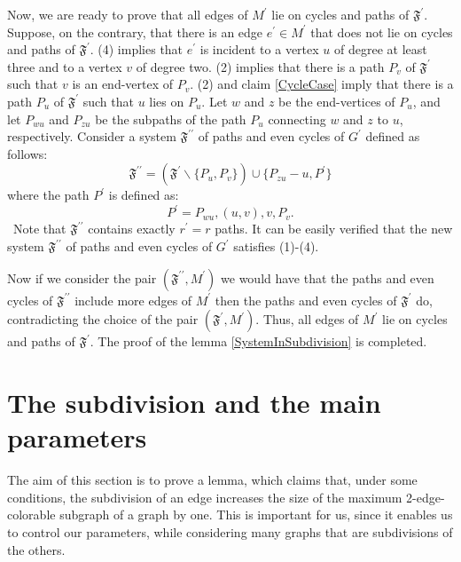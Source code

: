 \documentclass[fleqn,12pt,twoside]{article}
\newenvironment{proof}[1][Proof.]{\begin{trivlist}
\item[\hskip \labelsep {\bfseries #1}]}{\end{trivlist}}
\begin{document}
\begin{proof}
Now, we are ready to prove that all edges of $M^{\prime }$ lie on
cycles and paths of $\mathfrak{F}^{\prime }$. Suppose, on the
contrary, that there is an edge $e^{\prime }\in M^{\prime }$ that
does not lie on cycles and paths of $\mathfrak{F}^{\prime }$. (4)
implies that $e^{\prime }$ is incident to a vertex $u$ of degree at
least three and to a vertex $v$ of degree two. (2)
implies that there is a path $P_{v}$ of $\mathfrak{F}^{\prime }$ such that $v $ is an end-vertex of $P_{v}$. (2) and claim \ref{CycleCase} imply
that
there is a path $P_{u}$ of $\mathfrak{F}^{\prime }$ such that $u$ lies on $P_{u}$. Let $w$ and $z$ be the end-vertices of $P_{u}$, and let $P_{wu}$ and $P_{zu}$ be the subpaths of the path $P_{u}$ connecting $w$ and $z$
to $u$, respectively. Consider a system $\mathfrak{F}^{\prime \prime
}$ of paths and even cycles of $G^{\prime }$ defined as follows:
\begin{equation*}
\mathfrak{F}^{\prime \prime }=(\mathfrak{F}^{\prime }\backslash
\{P_{u},P_{v}\})\cup \{P_{zu}-u,P^{\prime }\}
\end{equation*}where the path $P^{\prime }$ is defined as:\begin{equation*}
P^{\prime }=P_{wu},(u,v),v,P_{v}\text{.}
\end{equation*}\ Note that $\mathfrak{F}^{\prime \prime }$ contains exactly
$r^{\prime }=r$ paths. It can be easily verified that the new system
$\mathfrak{F}^{\prime \prime }$ of paths and even cycles of
$G^{\prime }$ satisfies (1)-(4).

Now if we consider the pair $(\mathfrak{F}^{\prime \prime
},M^{\prime })$ we would have that the paths and even cycles of
$\mathfrak{F}^{\prime \prime }$
include more edges of $M^{\prime }$ then the paths and even cycles of $\mathfrak{F}^{\prime }$ do, contradicting the choice of the pair $(\mathfrak{F}^{\prime },M^{\prime })$. Thus, all edges of $M^{\prime }$ lie on
cycles
and paths of $\mathfrak{F}^{\prime }$. The proof of the lemma \ref {SystemInSubdivision} is completed.
\end{proof}

\section{The subdivision and the main parameters}

The aim of this section is to prove a lemma, which claims that,
under some conditions, the subdivision of an edge increases the size
of the maximum 2-edge-colorable subgraph of a graph by one. This is
important for us, since it enables us to control our parameters,
while considering many graphs that are subdivisions of the others.
\end{document}
